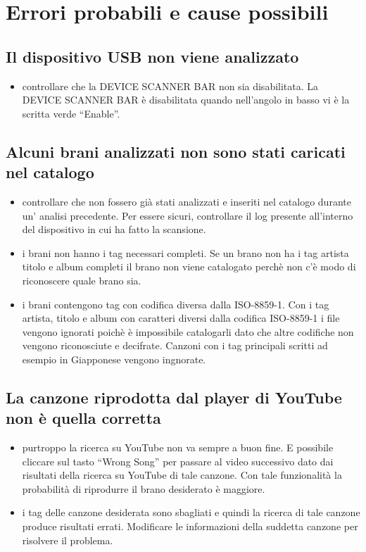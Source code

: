 \section{Errori probabili e cause possibili}

\subsection*{Il dispositivo USB non viene analizzato}
\begin{itemize}
  \item controllare che la DEVICE SCANNER BAR non sia disabilitata. La DEVICE
  SCANNER BAR \`e disabilitata quando nell'angolo in basso vi \`e la scritta
  verde ``Enable''.
\end{itemize}

\subsection*{Alcuni brani analizzati non sono stati caricati nel catalogo}
\begin{itemize}
  \item controllare che non fossero gi\`a stati analizzati e inseriti nel
  catalogo durante un' analisi precedente. Per essere sicuri, controllare il log
  presente all'interno del dispositivo in cui  ha fatto la scansione.
  \item i brani non hanno i tag necessari completi. Se un brano non ha i
  tag artista titolo e album completi il brano non viene catalogato perch\`e non
  c'\`e modo di riconoscere quale brano sia.
  \item i brani contengono tag con codifica diversa dalla ISO-8859-1. Con i tag
  artista, titolo e album con caratteri diversi dalla codifica ISO-8859-1 i file
  vengono ignorati poich\`e \`e impossibile catalogarli dato che altre codifiche
  non vengono riconosciute e decifrate. Canzoni con i tag principali scritti ad
  esempio in Giapponese vengono ingnorate.
\end{itemize}

\subsection*{La canzone riprodotta dal player di YouTube non \`e quella
corretta}
\begin{itemize}
  \item purtroppo la ricerca su YouTube non va sempre a buon fine. E possibile
  cliccare sul tasto ``Wrong Song'' per passare al video successivo dato dai
  risultati della ricerca su YouTube di tale canzone. Con tale funzionalit\`a la
  probabilit\`a di riprodurre il brano desiderato \`e maggiore.
  \item i tag delle canzone desiderata sono sbagliati e quindi la
  ricerca di tale canzone produce risultati errati. Modificare le informazioni
  della suddetta canzone per risolvere il problema.
\end{itemize}


